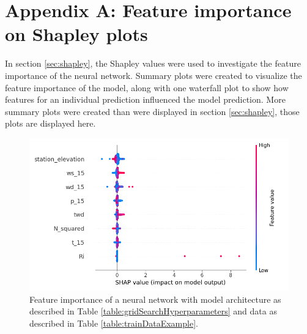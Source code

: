 \chapter*{Appendix A: Feature importance on Shapley plots}
\label{appendix:A}

In section \ref{sec:shapley}, the Shapley values were used to investigate the feature importance of the neural network. Summary plots were created to visualize the feature importance of the model, along with one waterfall plot to show how features for an individual prediction influenced the model prediction. More summary plots were created than were displayed in section \ref{sec:shapley}, those plots are displayed here.

\renewcommand{\thefigure}{A.\arabic{figure}} 
\setcounter{figure}{0} %

\begin{figure}[H]
    \centering
    \includegraphics[scale = 0.6]{Figures/shap_plots/summary_plot_190924_full_10ms.png}
    \caption[Shapley Summary plot using entire dataset.]{Feature importance of a neural network with model architecture as described in Table \ref{table:gridSearchHyperparameters} and data as described in Table \ref{table:trainDataExample}.}
    \label{fig:ShapleySummary3}
\end{figure}

